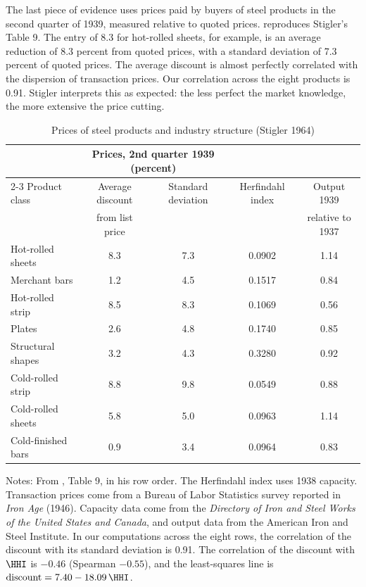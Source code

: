 The last piece of evidence uses prices paid by buyers of steel products in the second quarter of 1939, measured
relative to quoted prices.  reproduces Stigler's Table 9. The entry of 8.3 for hot-rolled
sheets, for example, is an average reduction of 8.3 percent from quoted prices, with a standard deviation of 7.3
percent of quoted prices. The average discount is almost perfectly correlated with the dispersion of transaction
prices. Our correlation across the eight products is 0.91. Stigler interprets this as expected: the less perfect the
market knowledge, the more extensive the price cutting.

\begin{table}[htbp]
\centering
\begin{threeparttable}
\caption{Prices of steel products and industry structure (Stigler 1964)}
\label{tab:02-stigler-t9}
\small
\begin{tabular}{@{}lcccc@{}}
\toprule
& \multicolumn{2}{c}{Prices, 2nd quarter 1939 (percent)} & & \\
\cmidrule(lr){2-3}
Product class & Average discount & Standard deviation & Herfindahl index & Output 1939 \\
& from list price & & & relative to 1937 \\
\midrule
Hot-rolled sheets   & 8.3 & 7.3 & 0.0902 & 1.14 \\
Merchant bars       & 1.2 & 4.5 & 0.1517 & 0.84 \\
Hot-rolled strip    & 8.5 & 8.3 & 0.1069 & 0.56 \\
Plates              & 2.6 & 4.8 & 0.1740 & 0.85 \\
Structural shapes   & 3.2 & 4.3 & 0.3280 & 0.92 \\
Cold-rolled strip   & 8.8 & 9.8 & 0.0549 & 0.88 \\
Cold-rolled sheets  & 5.8 & 5.0 & 0.0963 & 1.14 \\
Cold-finished bars  & 0.9 & 3.4 & 0.0964 & 0.83 \\
\bottomrule
\end{tabular}
\begin{tablenotes}\footnotesize
\item Notes: From \citet{Stigler1964}, Table 9, in his row order. The Herfindahl index uses 1938 capacity.
Transaction prices come from a Bureau of Labor Statistics survey reported in \textit{Iron Age} (1946). Capacity
data come from the \textit{Directory of Iron and Steel Works of the United States and Canada}, and output data
from the American Iron and Steel Institute. In our computations across the eight rows, the correlation of the
discount with its standard deviation is 0.91. The correlation of the discount with $\HHI$ is $-0.46$ (Spearman
$-0.55$), and the least-squares line is $\text{discount} = 7.40 - 18.09\,\HHI$.
\end{tablenotes}
\end{threeparttable}
\end{table}

